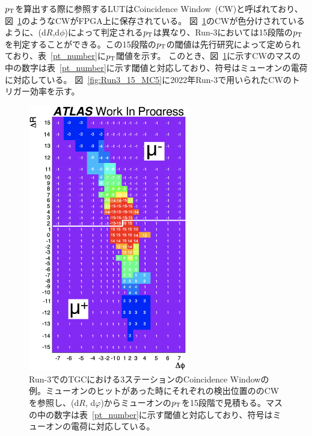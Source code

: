 $p_{\rm{T}}$を算出する際に参照するLUTはCoincidence Window~(CW)と呼ばれており、図~\ref{fig:CW}のようなCWがFPGA上に保存されている。
図~\ref{fig:CW}のCWが色分けされているように、(d$R$,d$\phi$)によって判定される$p_{\rm{T}}$は異なり、Run-3においては15段階の$p_{\rm{T}}$を判定することができる。この15段階の$p_{\rm{T}}$の閾値は先行研究\cite{article:shiomi-mron}によって定められており、表~\ref{pt_number}に$p_{\rm{T}}$閾値を示す。
このとき、図~\ref{fig:CW}に示すCWのマスの中の数字は表~\ref{pt_number}に示す閾値と対応しており、符号はミューオンの電荷に対応している。
図~\ref{fig:Run3_15_MC5}に2022年Run-3で用いられたCWのトリガー効率を示す。

\begin{figure}[tb]
  \centering
  \includegraphics[clip, width=7cm]{fig/3/Run3CW.pdf}
  \caption{Run-3でのTGCにおける3ステーションのCoincidence Windowの例\cite{article:shiomi-mron}。ミューオンのヒットがあった時にそれぞれの検出位置ののCWを参照し、(d$R$, d$φ$)からミューオンの$p_{\rm{T}}$を15段階で見積もる。マスの中の数字は表~\ref{pt_number}に示す閾値と対応しており、符号はミューオンの電荷に対応している。}
  \label{fig:CW}
\end{figure}

